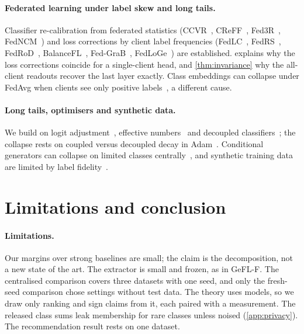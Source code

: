 \documentclass[10pt]{article}
\theoremstyle{plain}
\theoremstyle{definition}
\begin{document}
\paragraph{Federated learning under label skew and long tails.} Classifier re-calibration from federated statistics
(CCVR~\cite{luo2021ccvr}, CReFF~\cite{shang2022creff}, Fed3R~\cite{fani2024fed3r}, FedNCM~\cite{legate2023fedncm}) and
loss corrections by client label frequencies (FedLC~\cite{zhang2022fedlc}, FedRS~\cite{li2021fedrs},
FedRoD~\cite{chen2022fedrod}, BalanceFL~\cite{shuai2022balancefl}, Fed-GraB~\cite{xiao2023fedgrab},
FedLoGe~\cite{xiao2024fedloge}) are established.  explains why the loss corrections coincide for a
single-client head, and \cref{thm:invariance} why the all-client readouts recover the last layer exactly. Class
embeddings can collapse under FedAvg when clients see only positive labels~\cite{yu2020fedaws}, a different cause.

\paragraph{Long tails, optimisers and synthetic data.} We build on logit adjustment~\cite{menon2021logit}, effective
numbers~\cite{cui2019} and decoupled classifiers~\cite{kang2020decoupling}; the collapse rests on coupled versus
decoupled decay in Adam~\cite{loshchilov2019,kingma2015}. Conditional generators can collapse on limited classes
centrally~\cite{shahbazi2022}, and synthetic training data are limited by label fidelity~\cite{ravuri2019cas}.

\section{Limitations and conclusion}

\paragraph{Limitations.} Our margins over strong baselines are small; the claim is the decomposition, not a new
state of the art. The extractor is small and frozen, as in GeFL-F. The centralised comparison covers three datasets
with one seed, and only the fresh-seed comparison chose settings without test data. The theory uses models, so we draw
only ranking and sign claims from it, each paired with a measurement. The released class sums leak membership for rare
classes unless noised (\cref{app:privacy}). The recommendation result rests on one dataset.
\end{document}
